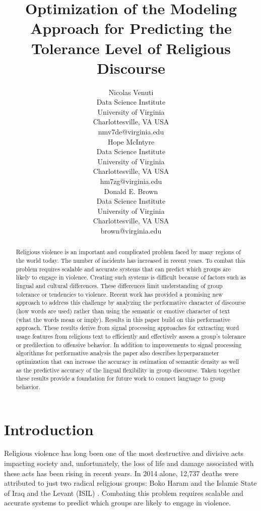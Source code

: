\documentclass[11pt, a4paper]{article}
\title{Optimization of the Modeling Approach for Predicting the Tolerance Level of Religious Discourse}
\author{Nicolas Venuti \\
  Data Science Institute \\
  University of Virginia \\
  Charlottesville, VA USA \\
  {nmv7de@virginia.edu} \\\And
  Hope McIntyre \\
  Data Science Institute \\
  University of Virginia \\
  Charlottesville, VA USA \\
  {hm7zg@virginia.edu}\\\And
  Donald E. Brown \\
  Data Science Institute \\
  University of Virginia \\
  Charlottesville, VA USA \\
  {brown@virginia.edu} \\}
\date{}
\begin{document}
\maketitle
\begin{abstract}
Religious violence is an important and complicated problem faced by many regions of the world today. The number of incidents has increased in recent years. To combat this problem requires scalable and accurate systems that can predict which groups are likely to engage in violence. Creating such systems is difficult because of factors such as lingual and cultural differences. These differences limit understanding of group tolerance or tendencies to violence. Recent work has provided a promising new approach to address this challenge by analyzing the performative character of discourse (how words are used) rather than using the semantic or emotive character of text (what the words mean or imply). Results in this paper build on this performative approach.  These results derive from signal processing approaches for extracting word usage features from religious text to efficiently and effectively assess a group's tolerance or predilection to offensive behavior. In addition to improvements to  signal processing algorithms  for performative analysis the paper also describes hyperparameter optimization that can increase the accuracy in estimation of semantic density as well as the predictive accuracy of the lingual flexibility in group discourse. Taken together these results provide a foundation for future work to connect language to group behavior.  
\end{abstract}

\section{Introduction}\label{Intro}


Religious violence has long been one of the most destructive and divisive acts impacting society and, unfortunately, the loss of life and damage associated with these acts has been rising in recent years. In 2014 alone, 12,737 deaths were attributed to just two  radical religious groups: Boko Haram and the Islamic State of Iraq and the Levant (ISIL) \cite{Searcey2015}. Combating this problem requires scalable and accurate systems to predict which groups are likely to engage in violence. 
\end{document}
